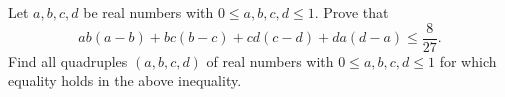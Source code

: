 Let $a,b,c,d$ be real numbers with $0\leqslant a,b,c,d\leqslant 1$. Prove that$$ab(a-b)+bc(b-c)+cd(c-d)+da(d-a)\leqslant \frac{8}{27}.$$Find all quadruples $(a,b,c,d)$ of real numbers with $0\leqslant a,b,c,d\leqslant 1$ for which equality holds in the above inequality.